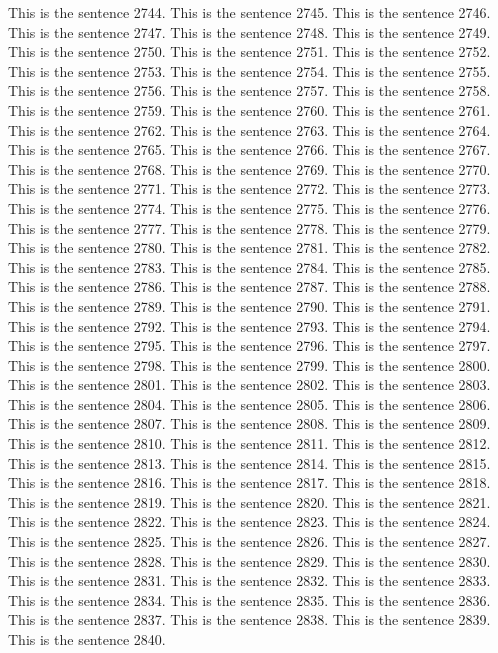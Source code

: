 \documentclass{article}
\begin{document}
This is the sentence 2744.
This is the sentence 2745.
This is the sentence 2746.
This is the sentence 2747.
This is the sentence 2748.
This is the sentence 2749.
This is the sentence 2750.
This is the sentence 2751.
This is the sentence 2752.
This is the sentence 2753.
This is the sentence 2754.
This is the sentence 2755.
This is the sentence 2756.
This is the sentence 2757.
This is the sentence 2758.
This is the sentence 2759.
This is the sentence 2760.
This is the sentence 2761.
This is the sentence 2762.
This is the sentence 2763.
This is the sentence 2764.
This is the sentence 2765.
This is the sentence 2766.
This is the sentence 2767.
This is the sentence 2768.
This is the sentence 2769.
This is the sentence 2770.
This is the sentence 2771.
This is the sentence 2772.
This is the sentence 2773.
This is the sentence 2774.
This is the sentence 2775.
This is the sentence 2776.
This is the sentence 2777.
This is the sentence 2778.
This is the sentence 2779.
This is the sentence 2780.
This is the sentence 2781.
This is the sentence 2782.
This is the sentence 2783.
This is the sentence 2784.
This is the sentence 2785.
This is the sentence 2786.
This is the sentence 2787.
This is the sentence 2788.
This is the sentence 2789.
This is the sentence 2790.
This is the sentence 2791.
This is the sentence 2792.
This is the sentence 2793.
This is the sentence 2794.
This is the sentence 2795.
This is the sentence 2796.
This is the sentence 2797.
This is the sentence 2798.
This is the sentence 2799.
This is the sentence 2800.
This is the sentence 2801.
This is the sentence 2802.
This is the sentence 2803.
This is the sentence 2804.
This is the sentence 2805.
This is the sentence 2806.
This is the sentence 2807.
This is the sentence 2808.
This is the sentence 2809.
This is the sentence 2810.
This is the sentence 2811.
This is the sentence 2812.
This is the sentence 2813.
This is the sentence 2814.
This is the sentence 2815.
This is the sentence 2816.
This is the sentence 2817.
This is the sentence 2818.
This is the sentence 2819.
This is the sentence 2820.
This is the sentence 2821.
This is the sentence 2822.
This is the sentence 2823.
This is the sentence 2824.
This is the sentence 2825.
This is the sentence 2826.
This is the sentence 2827.
This is the sentence 2828.
This is the sentence 2829.
This is the sentence 2830.
This is the sentence 2831.
This is the sentence 2832.
This is the sentence 2833.
This is the sentence 2834.
This is the sentence 2835.
This is the sentence 2836.
This is the sentence 2837.
This is the sentence 2838.
This is the sentence 2839.
This is the sentence 2840.
\end{document}
